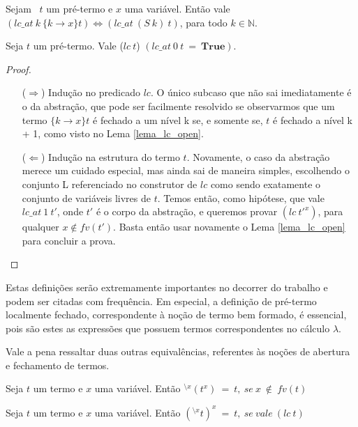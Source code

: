 \begin{lema}\label{lema_lc_open}
    Sejam \ $t$ um pré-termo e $x$ uma variável. Então vale 
    $(lc\_at\ k\ \{k \rightarrow x\}t) \iff (lc\_at\ (S\ k)\ t)$, para todo $k
    \in \mathbb{N}$.
\end{lema}

\begin{teorema} \label{teo:lc_lc_at}
    Seja $t$ um pré-termo. Vale ($lc\ t$) \iff $(lc\_at\
    0\ t\ =\ \textbf{True})$.
\end{teorema}

\begin{proof} 
    $ $\par\nobreak\ignorespaces
\begin{itemize}
    \item[($\Rightarrow$)] Indução no predicado $lc$. O único
        subcaso que não sai imediatamente é o da abstração, que pode ser
        facilmente resolvido se observarmos que um termo $\{k \rightarrow x\}t$
        é fechado a um nível k se, e somente se, $t$ é fechado a nível k + 1,
        como visto no Lema \ref{lema_lc_open}.
    \item[($\Leftarrow$)] Indução na estrutura do termo $t$.
        Novamente, o caso da abstração merece um cuidado especial, mas ainda sai
        de maneira simples, escolhendo o conjunto L referenciado no construtor
        de $lc$ como sendo exatamente o conjunto de variáveis livres de $t$.
        Temos então, como hipótese, que vale $lc\_at\ 1\ t'$, onde $t'$ é o
        corpo da abstração, e queremos provar $(lc\ t'^x)$, para qualquer $x
        \notin fv(t')$. Basta então usar novamente o Lema \ref{lema_lc_open}
        para concluir a prova.
\end{itemize}
\end{proof}

Estas definições serão extremamente importantes no decorrer do trabalho e podem
ser citadas com frequência. Em especial, a definição de pré-termo localmente
fechado, correspondente à noção de termo bem formado, é essencial, pois são
estes as expressões que possuem termos correspondentes no cálculo $\lambda$.

Vale a pena ressaltar duas outras equivalências, referentes às noções de
abertura e fechamento de termos. 

\begin{lema}
    Seja $t$ um termo e $x$ uma variável. Então $^{\setminus x}(t^{x})\ =\ t,\ se\ x\
    \notin\ fv(t) $
\end{lema}
\begin{lema}
    Seja $t$ um termo e $x$ uma variável. Então $(^{\setminus x}t)^{x}\ =\ t,\ se\
    vale\ (lc\ t)$ 
\end{lema}

